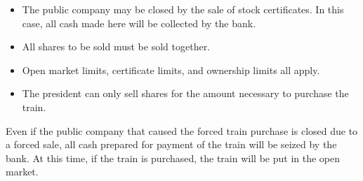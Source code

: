 \documentclass{article}
\begin{document}
\begin{CJK}{UTF8}{min}
\begin{multicols}{2}
\begin{itemize}
\item The public company may be closed by the sale of stock
  certificates. In this case, all cash made here will be collected by
  the bank.

\item All shares to be sold must be sold together.

\item Open market limits, certificate limits, and ownership limits all apply.

\item The president can only sell shares for the amount necessary to
  purchase the train.
\end{itemize}

Even if the public company that caused the forced train purchase is closed
due to a forced sale, all cash prepared for payment of the train will
be seized by the bank. At this time, if the train is purchased, the
train will be put in the open market.
\end{multicols}

\renewcommand*{\thesection}{\Roman{section}}
\renewcommand*{\theHsection}{appendix.\Alph{section}}
\setcounter{section}{0}







\end{CJK}
\end{document}
